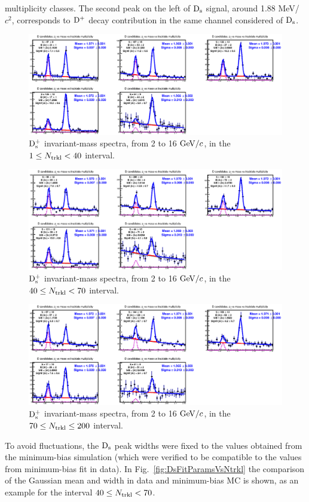 multiplicity classes. The second peak on the left of ${\rm D_s}$ signal, around 1.88 MeV/$c^2$,
corresponds to ${\rm D^+}$ decay contribution in the same channel considered of ${\rm D_s}$.
\begin{figure}[htpb]
\centering
 \includegraphics[width=.9\textwidth]{FigCap6/DsMass140.eps}
  \caption{${\rm D_s^+}$ invariant-mass spectra, from 2 to 16 $\mathrm{GeV}/c$, in the $1 \leq N_{\rm trkl} < 40$ interval.}
 \label{fig:DsInvMassVsNtrkl_1}
\end{figure}
\begin{figure}[htpb]
\centering
 \includegraphics[width=.9\textwidth]{FigCap6/DsMass4070.eps}
  \caption{${\rm D_s^+}$ invariant-mass spectra, from 2 to 16 $\mathrm{GeV}/c$, in the $40 \leq N_{\rm trkl} < 70$ interval.}
 \label{fig:DsInvMassVsNtrkl_2}
\end{figure}
\begin{figure}[htpb]
\centering
 \includegraphics[width=.9\textwidth]{FigCap6/DsMass70200.eps}
  \caption{${\rm D_s^+}$ invariant-mass spectra, from 2 to 16 $\mathrm{GeV}/c$, in the $70 \leq N_{\rm trkl} \leq 200$ interval.}
 \label{fig:DsInvMassVsNtrkl_3}
\end{figure}
To avoid fluctuations, the ${\rm D_s}$ peak widths were fixed to the values obtained from the 
minimum-bias simulation (which were verified to be compatible to the values
from minimum-bias fit in data). In Fig.~\ref{fig:DsFitParamsVsNtrkl} 
the comparison of the Gaussian mean and width 
in data and minimum-bias MC is shown, as an example for the interval $40 \leq N_{\rm trkl} < 70$. 

